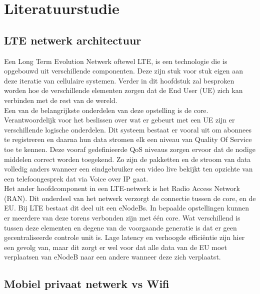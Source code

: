 
\section{Literatuurstudie}%
\label{sec:state-of-the-art}

\subsection{LTE netwerk architectuur}

Een Long Term Evolution Netwerk oftewel LTE, is een technologie die is opgebouwd uit verschillende componenten. Deze zijn stuk voor stuk eigen aan deze iteratie van cellulaire systemen. Verder in dit hoofdstuk zal besproken worden hoe de verschillende elementen zorgen dat de End User (UE) zich kan verbinden met de rest van de wereld.\\

Een van de belangrijkste onderdelen van deze opstelling is de core. Verantwoordelijk voor het beslissen over wat er gebeurt met een UE zijn er verschillende logische onderdelen. Dit systeem bestaat er vooral uit om abonnees te registreren en daarna hun data stromen elk een niveau van Quality Of Service toe te kennen. Deze vooraf gedefinieerde QoS niveaus zorgen ervoor dat de nodige middelen correct worden toegekend. Zo zijn de pakketten en de stroom van data volledig anders wanneer een eindgebruiker een video live bekijkt ten opzichte van een telefoongesprek dat via Voice over IP gaat. \autocite{Palat2011} \\

Het ander hoofdcomponent in een LTE-netwerk is het Radio Access Network (RAN). Dit onderdeel van het netwerk verzorgt de connectie tussen de core, en de EU. Bij LTE bestaat dit deel uit een eNodeBs. In bepaalde opstellingen kunnen er meerdere van deze torens verbonden zijn met één core. Wat verschillend is tussen deze elementen en degene van de voorgaande generatie is dat er geen gecentraliseerde controle unit is. Lage latency en verhoogde efficiëntie zijn hier een gevolg van, maar dit zorgt er wel voor dat alle data van de EU moet verplaatsen van eNodeB naar een andere wanneer deze zich verplaatst. \autocite{Palat2011} \\

\subsection{Mobiel privaat netwerk vs Wifi}

